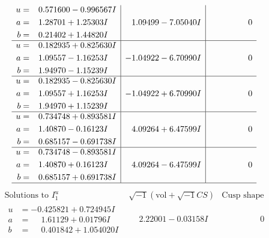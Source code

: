 \documentclass[1p]{elsarticle_modified}
\theoremstyle{definition}
\newcommand{\I}{\sqrt{-1}}
\begin{document}
$$\begin{array}{c|c|c}
\begin{aligned}
u &= \phantom{-}0.571600 - 0.996567 I \\
a &= \phantom{-}1.28701 + 1.25303 I \\
b &= \phantom{-}0.21402 + 1.44820 I\end{aligned}
 & \phantom{-}1.09499 - 7.05040 I & \phantom{-0.000000 } 0 \\ \hline\begin{aligned}
u &= \phantom{-}0.182935 + 0.825630 I \\
a &= \phantom{-}1.09557 - 1.16253 I \\
b &= \phantom{-}1.94970 - 1.15239 I\end{aligned}
 & -1.04922 - 6.70990 I & \phantom{-0.000000 } 0 \\ \hline\begin{aligned}
u &= \phantom{-}0.182935 - 0.825630 I \\
a &= \phantom{-}1.09557 + 1.16253 I \\
b &= \phantom{-}1.94970 + 1.15239 I\end{aligned}
 & -1.04922 + 6.70990 I & \phantom{-0.000000 } 0 \\ \hline\begin{aligned}
u &= \phantom{-}0.734748 + 0.893581 I \\
a &= \phantom{-}1.40870 - 0.16123 I \\
b &= \phantom{-}0.685157 - 0.691738 I\end{aligned}
 & \phantom{-}4.09264 + 6.47599 I & \phantom{-0.000000 } 0 \\ \hline\begin{aligned}
u &= \phantom{-}0.734748 - 0.893581 I \\
a &= \phantom{-}1.40870 + 0.16123 I \\
b &= \phantom{-}0.685157 + 0.691738 I\end{aligned}
 & \phantom{-}4.09264 - 6.47599 I & \phantom{-0.000000 } 0\\
 \hline 
 \end{array}$$\newpage$$\begin{array}{c|c|c}  
\text{Solutions to }I^u_{1}& \I (\text{vol} + \sqrt{-1}CS) & \text{Cusp shape}\\
 \hline 
\begin{aligned}
u &= -0.425821 + 0.724945 I \\
a &= \phantom{-}1.61129 + 0.01796 I \\
b &= \phantom{-}0.401842 + 1.054020 I\end{aligned}
 & \phantom{-}2.22001 - 0.03158 I & \phantom{-0.000000 } 0 \\ \hline\begin{aligned}

\end{aligned}
\end{array}$$
\end{document}
